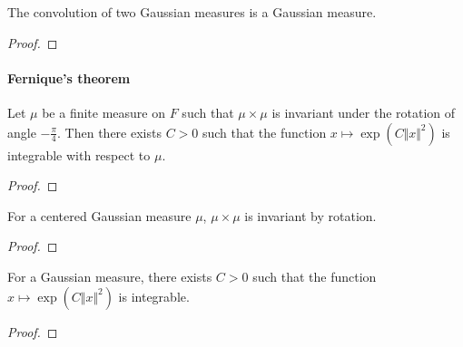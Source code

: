 \begin{lemma}\label{lem:isGaussian_conv}
  \mathlibok
The convolution of two Gaussian measures is a Gaussian measure.
\end{lemma}

\begin{proof}
\end{proof}



\paragraph{Fernique's theorem}


\begin{theorem}\label{thm:exists_integrable_exp_sq_of_map_rotation_eq_self}
  \mathlibok
Let $\mu$ be a finite measure on $F$ such that $\mu \times \mu$ is invariant under the rotation of angle $-\frac{\pi}{4}$.
Then there exists $C > 0$ such that the function $x \mapsto \exp (C \Vert x \Vert ^ 2)$ is integrable with respect to $\mu$.
\end{theorem}

\begin{proof}
\end{proof}


\begin{lemma}\label{lem:IsGaussian.map_rotation_eq_self}
  \mathlibok
For a centered Gaussian measure $\mu$, $\mu \times \mu$ is invariant by rotation.
\end{lemma}

\begin{proof}  

\end{proof}


\begin{theorem}\label{thm:IsGaussian.exists_integrable_exp_sq}
  \mathlibok
For a Gaussian measure, there exists $C > 0$ such that the function $x \mapsto \exp (C \Vert x \Vert ^ 2)$ is integrable.
\end{theorem}

\begin{proof}  

\end{proof}


